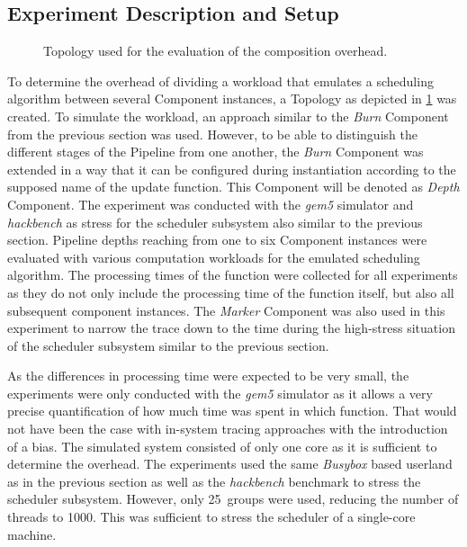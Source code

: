 \subsection{Experiment Description and Setup}

\begin{figure}[!b] \centering
	\caption{Topology used for the evaluation of the composition overhead.}%
	\label{fig:eval:overhead-topo}
\end{figure}


To determine the overhead of dividing a workload that emulates a scheduling algorithm between several Component instances, a Topology as depicted in \cref{fig:eval:overhead-topo} was created. To simulate the workload, an approach similar to the \emph{Burn} Component from the previous section was used. However, to be able to distinguish the different stages of the Pipeline from one another, the \emph{Burn} Component was extended in a way that it can be configured during instantiation according to the supposed name of the update function. This Component will be denoted as \emph{Depth} Component. The experiment was conducted with the \emph{gem5} simulator and \emph{hackbench} as stress for the scheduler subsystem also similar to the previous section. Pipeline depths reaching from one to six Component instances were evaluated with various computation workloads for the emulated scheduling algorithm. The processing times of the  function were collected for all experiments as they do not only include the processing time of the  function itself, but also all subsequent component instances. The \emph{Marker} Component was also used in this experiment to narrow the trace down to the time during the high-stress situation of the scheduler subsystem similar to the previous section.

As the differences in processing time were expected to be very small, the experiments were only conducted with the \emph{gem5} simulator as it allows a very precise quantification of how much time was spent in which function. That would not have been the case with in-system tracing approaches with the introduction of a bias. The simulated system consisted of only one core as it is sufficient to determine the overhead. The experiments used the same \emph{Busybox} based userland as in the previous section as well as the \emph{hackbench} benchmark to stress the scheduler subsystem. However, only \num{25}~groups were used, reducing the number of threads to \num{1000}. This was sufficient to stress the scheduler of a single-core machine.

